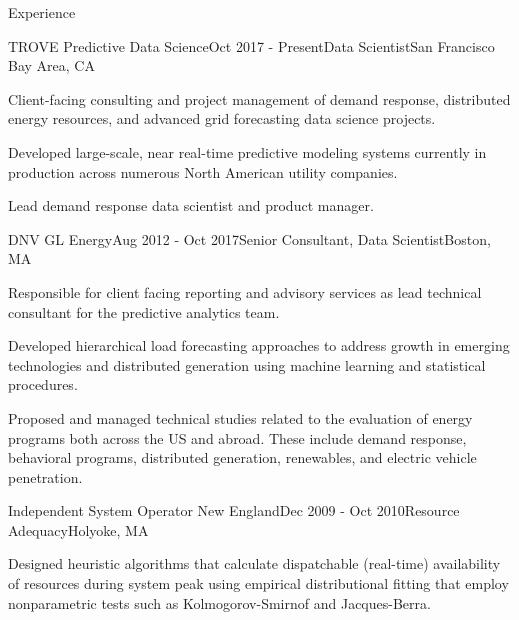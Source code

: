 \documentclass{resume} %
\begin{document}

\begin{rSection}{Experience}
\begin{rSubsection}{TROVE Predictive Data Science}{Oct 2017 - Present}{Data Scientist}{San Francisco Bay Area, CA}
\item Client-facing consulting and project management of demand response, distributed energy resources, and advanced grid forecasting data science projects.
\item Developed large-scale, near real-time predictive modeling systems currently in production across numerous North American utility companies.
\item Lead demand response data scientist and product manager.
\end{rSubsection}


\begin{rSubsection}{DNV GL Energy}{Aug 2012 - Oct 2017}{Senior Consultant, Data Scientist}{Boston, MA}
\item Responsible for client facing reporting and advisory services as lead technical consultant for the  predictive analytics team.
\item Developed hierarchical load forecasting approaches to address growth in emerging technologies and distributed generation using machine learning and statistical procedures.
\item Proposed and managed technical studies related to the evaluation of energy programs both across the US and abroad. These include demand response, behavioral programs, distributed generation, renewables, and electric vehicle  penetration. 

\end{rSubsection}


\begin{rSubsection}{Independent System Operator New England}{Dec 2009 - Oct 2010}{Resource Adequacy}{Holyoke, MA}

\item Designed heuristic algorithms that calculate dispatchable (real-time) availability of resources during system peak using empirical distributional fitting that employ nonparametric tests such as Kolmogorov-Smirnof and Jacques-Berra.


\end{rSubsection}
\end{rSection}
\end{document}
